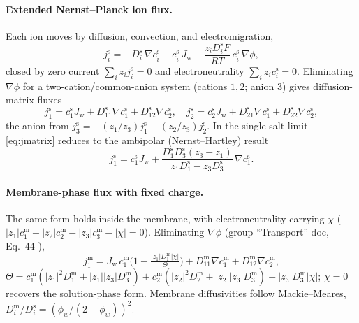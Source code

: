 \documentclass[11pt]{article}
\newcommand{\cm}[1]{{c^{\mathrm{m}}_{#1}}}
\newcommand{\cs}[1]{{c^{\mathrm{s}}_{#1}}}
\newcommand{\Jw}{J_{\mathrm{w}}}
\newcommand{\grad}{\nabla}
\begin{document}
\paragraph{Extended Nernst--Planck ion flux.} Each ion moves by diffusion,
convection, and electromigration,
\begin{equation}
  j^{\mathrm s}_i = -D^{\mathrm s}_i\,\grad \cs{i} + \cs{i}\,\Jw
        - \frac{z_i D^{\mathrm s}_i F}{RT}\,\cs{i}\,\grad\phi,
  \label{eq:ENP}
\end{equation}
closed by zero current $\sum_i z_i j^{\mathrm s}_i=0$ and electroneutrality
$\sum_i z_i \cs{i}=0$. Eliminating $\grad\phi$ for a two-cation/common-anion
system (cations $1,2$; anion $3$) gives diffusion-matrix fluxes
\begin{equation}
  j^{\mathrm s}_1 = \cs{1}\Jw + D^{\mathrm s}_{11}\grad \cs{1} + D^{\mathrm s}_{12}\grad \cs{2},
  \quad
  j^{\mathrm s}_2 = \cs{2}\Jw + D^{\mathrm s}_{21}\grad \cs{1} + D^{\mathrm s}_{22}\grad \cs{2},
  \label{eq:jmatrix}
\end{equation}
the anion from $j^{\mathrm s}_3=-(z_1/z_3)j^{\mathrm s}_1-(z_2/z_3)j^{\mathrm s}_2$.
In the single-salt limit \eqref{eq:jmatrix} reduces to the ambipolar
(Nernst--Hartley) result
\begin{equation}
  j^{\mathrm s}_1 = \cs{1}\Jw
    + \frac{D^{\mathrm s}_1 D^{\mathrm s}_3(z_3-z_1)}{z_1 D^{\mathrm s}_1 - z_3 D^{\mathrm s}_3}\,\grad \cs{1}.
  \label{eq:ambipolar}
\end{equation}

\paragraph{Membrane-phase flux with fixed charge.} The same form holds inside the
membrane, with electroneutrality carrying $\chi$
($|z_1|\cm{1}+|z_2|\cm{2}-|z_3|\cm{3}-|\chi|=0$). Eliminating $\grad\phi$
(group ``Transport'' doc, Eq.~44 \cite{transportDoc}),
\begin{equation}
  j^{\mathrm m}_1 = \Jw\,\cm{1}\Big(1-\tfrac{|z_1|D^{\mathrm m}_1|\chi|}{\Theta}\Big)
   + D^{\mathrm m}_{11}\grad \cm{1} + D^{\mathrm m}_{12}\grad \cm{2},
  \label{eq:memflux}
\end{equation}
$\Theta = \cm{1}(|z_1|^2 D^{\mathrm m}_1+|z_1||z_3|D^{\mathrm m}_3)
+\cm{2}(|z_2|^2 D^{\mathrm m}_2+|z_2||z_3|D^{\mathrm m}_3)-|z_3|D^{\mathrm m}_3|\chi|$;
$\chi=0$ recovers the solution-phase form. Membrane diffusivities follow
Mackie--Meares, $D^{\mathrm m}_i/D^{\mathrm s}_i=(\phi_w/(2-\phi_w))^2$.
\end{document}
